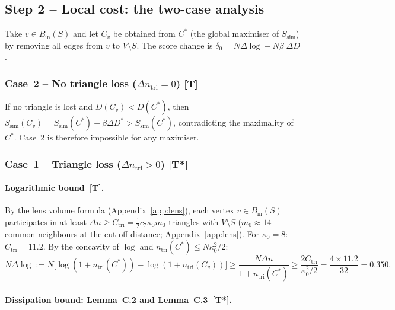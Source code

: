 \documentclass[11pt, a4paper]{article}
\begin{document}
\subsection{Step 2 – Local cost: the two-case analysis}
\label{sec:local-cost}

Take $v\in B_{\mathrm{in}}(S)$ and let $C_v$ be obtained from $C^*$
(the global maximiser of $S_{\text{sim}}$) by removing all edges
from $v$ to $V\setminus S$.
The score change is $\delta_0 = N\Delta\log - N\beta|\Delta D|$.

\subsubsection{Case~2 – No triangle loss ($\Delta n_{\mathrm{tri}}=0$) [T]}

If no triangle is lost and $D(C_v)<D(C^*)$, then
$S_{\text{sim}}(C_v)=S_{\text{sim}}(C^*)+\beta\Delta D^*>S_{\text{sim}}(C^*)$,
contradicting the maximality of $C^*$.
Case~2 is therefore impossible for any maximiser.

\subsubsection{Case~1 – Triangle loss ($\Delta n_{\mathrm{tri}}>0$) [T*]}

\paragraph{Logarithmic bound~[T].}
By the lens volume formula (Appendix~\ref{app:lens}),
each vertex $v\in B_{\mathrm{in}}(S)$ participates in at least
$\Delta n\ge C_{\mathrm{tri}}=\frac12 c_7\kappa_0 m_0$ triangles with
$V\setminus S$ ($m_0\approx14$ common neighbours at the cut-off
distance; Appendix~\ref{app:lens}).
For $\kappa_0=8$: $C_{\mathrm{tri}}=11.2$.
By the concavity of $\log$ and $n_{\mathrm{tri}}(C^*)\le N\kappa_0^2/2$:
\begin{equation}\label{eq:log-bound}
  N\Delta\log
  := N\bigl[\log(1+n_{\mathrm{tri}}(C^*))-\log(1+n_{\mathrm{tri}}(C_v))\bigr]
  \ge \frac{N\Delta n}{1+n_{\mathrm{tri}}(C^*)}
  \ge \frac{2C_{\mathrm{tri}}}{\kappa_0^2/2}
  = \frac{4\times11.2}{32} = 0.350.
\end{equation}

\paragraph{Dissipation bound: Lemma~C.2 and Lemma~C.3~[T*].}
\end{document}
